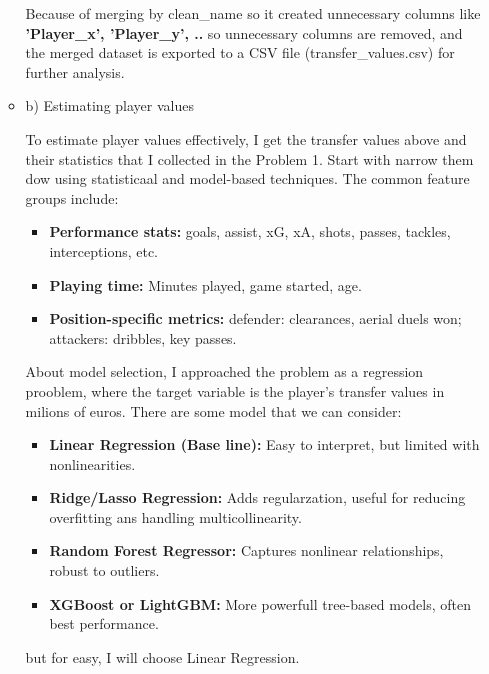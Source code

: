 \documentclass[a4paper,12pt]{article}
\begin{document}
\begin{itemize}[label= {*}, leftmargin= 1cm]
\begin{itemize}[label= {}, leftmargin= 1cm]
        Because of merging by clean\_name so it created unnecessary columns like \textbf{'Player\_x', 'Player\_y', ..} so unnecessary columns are removed, and the merged dataset is exported to a CSV file (transfer\_values.csv) for further analysis.
        \vspace{0.3cm}

        \item b) Estimating player values
        \vspace{0.3cm}

        To estimate player values effectively, I get the transfer values above and their statistics that I collected in the Problem 1. Start with narrow them dow using statisticaal and model-based techniques. The common feature groups include:
        \begin{itemize}[label= {+}, leftmargin= 1cm]
            \item \textbf{Performance stats:} goals, assist, xG, xA, shots, passes, tackles, interceptions, etc.
            \item \textbf{Playing time:} Minutes played, game started, age.
            \item \textbf{Position-specific metrics:} defender: clearances, aerial duels won; attackers: dribbles, key passes.
        \end{itemize}
        \vspace{0.3cm}
        
        About model selection, I approached the problem as a regression prooblem, where the target variable is the player's transfer values in milions of euros. There are some model that we can consider:
        \begin{itemize}[label= {+}, leftmargin= 1cm]
            \item \textbf{Linear Regression (Base line):} Easy to interpret, but limited with nonlinearities.
            \item \textbf{Ridge/Lasso Regression:} Adds regularzation, useful for reducing overfitting ans handling multicollinearity.
            \item \textbf{Random Forest Regressor:} Captures nonlinear relationships, robust to outliers.
            \item  \textbf{XGBoost or LightGBM:} More powerfull tree-based models, often best performance.
        \end{itemize}
        but for easy, I will choose Linear Regression.
        \vspace{0.3cm}


\end{itemize}
\end{itemize}
\end{document}
